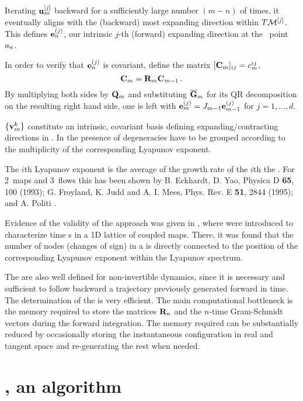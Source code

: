 Iterating ${\bf u}_m^{[j]}$ backward for a sufficiently large
number $(m-n)$ of times, it eventually aligns with the
(backward) most expanding direction within $T\mathcal{M}^{[j]}$. This
defines  ${\bf e}_n^{(j)}$, our intrinsic $j$-th (forward)
expanding direction at the \statesp\ point $a_n$.

In order to verify that ${\bf e}_n^{(j)}$ is covariant, define
the matrix $[{\bf C}_m]_{ij} = c_m^{ij}$,
\[
{\bf C}_m = {\bf R}_m {\bf C}_{m-1}
\,.
\]
By multiplying both sides by ${\bf Q}_m$ and substituting
$\overline {\bf G}_m$ for its QR decomposition on the resulting
right hand side, one is left with ${\bf
e}_{m}^{(j)}=J_{m-1} {\bf e}_{m-1}^{(j)}$ for $j=1,\ldots,
d$.

{\CLvs} $\{{\bf v}_{m}^k\}$ constitute an
intrinsic, covariant basis defining expanding/contracting
directions in \statesp.
In the presence of degeneracies {\cLvs}
have to be grouped according to the multiplicity of the
corresponding Lyapunov exponent.

The $i$th Lyapunov exponent is the average of the growth rate
of the $i$th the {\cLv}. For 2\dmn\ maps and
3\dmn\ flows this has been shown by B. Eckhardt, D. Yao,
Physica D {\bf 65}, 100 (1993); G. Froyland, K. Judd and A. I.
Mees, Phys. Rev. E {\bf 51}, 2844 (1995); and A. Politi
\etal{}.

Evidence of the validity of the approach was given in
, where {\cLvs} were
introduced to characterize time {\po s} in a 1D
lattice of coupled maps. There, it was found that the number
of nodes (changes of sign) in a {\cLvs} is
directly connected to the position of the corresponding
Lyapunov exponent within the Lyapunov spectrum.


The {\cLvs} are also well defined for
non-invertible dynamics, since it is necessary and sufficient
to follow backward a trajectory previously generated forward in
time. The determination of the {\cLvs} is
very efficient. The main computational bottleneck is the memory
required to store the matrices ${\bf R}_n$ and the $n$-time
Gram-Schmidt vectors during the forward integration. The memory
required can be substantially reduced by occasionally storing
the instantaneous configuration in real and tangent space and
re-generating the rest when needed.


\section{{\CLvs}, an algorithm}

